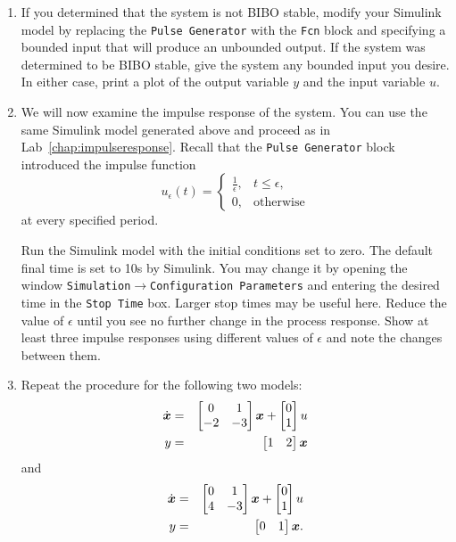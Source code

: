 \begin{enumerate}
\item If you determined that the system is not BIBO stable, modify your
\textsf{Simulink} model by replacing the \verb|Pulse Generator| with the
\verb|Fcn| block and specifying a bounded input that will produce an
unbounded output.  If the system was determined to be BIBO stable, give the
system any bounded input you desire.  In either case, print a plot of the
output variable $y$ and the input variable $u$\@.

\item We will now examine the impulse response of the system.  You can use
the same \textsf{Simulink} model generated above and proceed as in
Lab~\ref{chap:impulseresponse}\@.  Recall that the \verb|Pulse Generator|
block introduced the impulse function
\begin{equation*}
u_{\epsilon}(t)=\begin{cases}\frac{1}{\epsilon},&
t\leq\epsilon,\\0,&\textrm{otherwise}\end{cases}
\end{equation*}
at every specified period.

Run the \textsf{Simulink} model with the initial conditions set to zero.  The
default final time is set to 10s by \textsf{Simulink}\@.  You may change it
by opening the window
\verb|Simulation|$\rightarrow$\verb|Configuration Parameters| and entering
the desired time in the \verb|Stop Time| box.  Larger stop times may be
useful here. Reduce the value of $\epsilon$ until you see no further change
in the process response. Show at least three impulse responses using
different values of $\epsilon$ and note the changes between them.

\item Repeat the procedure for the following two models:
\begin{eqnarray*}
\dot{\boldsymbol{x}}&=&\begin{bmatrix}0&1\\-2&-3\\\end{bmatrix}\boldsymbol{x}+
\begin{bmatrix}0\\1\end{bmatrix}u\\
y&=&\begin{bmatrix}1&2\end{bmatrix}\boldsymbol{x}
\end{eqnarray*}
and
\begin{eqnarray*}
\dot{\boldsymbol{x}}&=&\begin{bmatrix}0&1\\4&-3\\\end{bmatrix}\boldsymbol{x}+
\begin{bmatrix}0\\1\end{bmatrix}u\\
y&=&\begin{bmatrix}0&1\end{bmatrix}\boldsymbol{x}.
\end{eqnarray*}


\end{enumerate}
